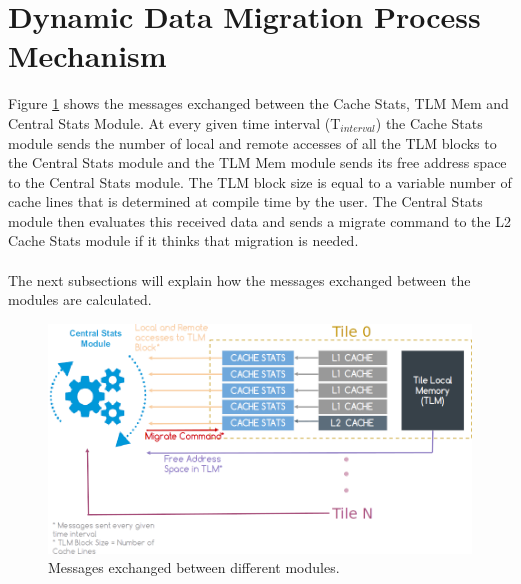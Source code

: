 \documentclass{listhesis}
\begin{document}
\section{Dynamic Data Migration Process Mechanism}
Figure \ref{fig:approachOfSolution} shows the messages exchanged between the Cache Stats, TLM Mem and Central Stats Module. At every given time interval (T$_{interval}$) the Cache Stats module sends the number of local and remote accesses of all the TLM blocks to the Central Stats module and the TLM Mem module sends its free address space to the Central Stats module. The TLM block size is equal to a variable number of cache lines that is determined at compile time by the user. The Central Stats module then evaluates this received data and sends a migrate command to the L2 Cache Stats module if it thinks that migration is needed. \\
\\
The next subsections will explain how the messages exchanged between the modules are calculated. 
\begin{figure}
  \includegraphics[width=\linewidth]{approachOfSolution1.png}
  \centering
  \caption{Messages exchanged between different modules.}
  \label{fig:approachOfSolution}
\end{figure}
\end{document}
